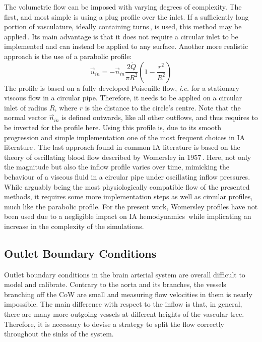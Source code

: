 The volumetric flow can be imposed with varying degrees of complexity. The first, and most simple is using a plug profile over the inlet. If a sufficiently long portion of vasculature, ideally containing turns\,\cite{Hodis2015}, is used, this method may be applied\,\cite{Berg2019}. Its main advantage is that it does not require a circular inlet to be implemented and can instead be applied to any surface. Another more realistic approach is the use of a parabolic profile:
\begin{equation*}
	\vec{u}_{in} = -\vec{n}_{in}\frac{2\dot{Q}}{\pi R^2}\left(1-\frac{r^2}{R^2}\right)
\end{equation*}
The profile is based on a fully developed Poiseuille flow, \textit{i.e.} for a stationary viscous flow in a circular pipe. Therefore, it needs to be applied on a circular inlet of radius $R$, where $r$ is the distance to the circle's centre. Note that the normal vector $\vec{n}_{in}$ is defined outwards, like all other outflows, and thus requires to be inverted for the profile here. Using this profile is, due to its smooth progression and simple implementation one of the most frequent choices in IA literature\,\cite{Vignon-Clementel2006, Lynch2022}. The last approach found in common IA literature is based on the theory of oscillating blood flow described by Womersley in 1957\,\cite{Womersley1957}. Here, not only the magnitude but also the inflow profile varies over time, mimicking the behaviour of a viscous fluid in a circular pipe under oscillating inflow pressures. While arguably being the most physiologically compatible flow of the presented methods, it requires some more implementation steps as well as circular profiles, much like the parabolic profile. For the present work, Womersley profiles have not been used due to a negligible impact on IA hemodynamics\,\cite{Berg2015} while implicating an increase in the complexity of the simulations.


\subsection{Outlet Boundary Conditions}\label{chap3:sec2:subsec:4}
Outlet boundary conditions in the brain arterial system are overall difficult to model and calibrate. Contrary to the aorta and its branches, the vessels branching off the CoW are small and measuring flow velocities in them is nearly impossible. The main difference with respect to the inflow is that, in general, there are many more outgoing vessels at different heights of the vascular tree. Therefore, it is necessary to devise a strategy to split the flow correctly throughout the sinks of the system.

